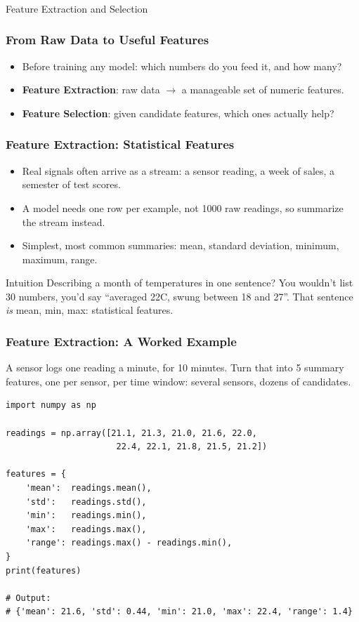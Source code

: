 \begin{frame}[fragile]\frametitle{}
\begin{center}
{\Large Feature Extraction and Selection}
\end{center}
\end{frame}

\begin{frame}[fragile]\frametitle{From Raw Data to Useful Features}
\begin{itemize}
\item Before training any model: which numbers do you feed it, and how many?
\item \textbf{Feature Extraction}: raw data $\to$ a manageable set of numeric features.
\item \textbf{Feature Selection}: given candidate features, which ones actually help?
\end{itemize}
\end{frame}

\begin{frame}[fragile]\frametitle{Feature Extraction: Statistical Features}
\begin{itemize}
\item Real signals often arrive as a stream: a sensor reading, a week of sales, a semester of test scores.
\item A model needs one row per example, not 1000 raw readings, so summarize the stream instead.
\item Simplest, most common summaries: mean, standard deviation, minimum, maximum, range.
\end{itemize}

\begin{block}{Intuition}
Describing a month of temperatures in one sentence? You wouldn't list 30 numbers, you'd say ``averaged 22\textdegree C, swung between 18 and 27''. That sentence \emph{is} mean, min, max: statistical features.
\end{block}
\end{frame}

\begin{frame}[fragile]\frametitle{Feature Extraction: A Worked Example}
A sensor logs one reading a minute, for 10 minutes. Turn that into 5 summary features, one per sensor, per time window: several sensors, dozens of candidates.
\begin{lstlisting}
import numpy as np

readings = np.array([21.1, 21.3, 21.0, 21.6, 22.0,
                      22.4, 22.1, 21.8, 21.5, 21.2])

features = {
    'mean':  readings.mean(),
    'std':   readings.std(),
    'min':   readings.min(),
    'max':   readings.max(),
    'range': readings.max() - readings.min(),
}
print(features)

# Output:
# {'mean': 21.6, 'std': 0.44, 'min': 21.0, 'max': 22.4, 'range': 1.4}
\end{lstlisting}
\end{frame}

